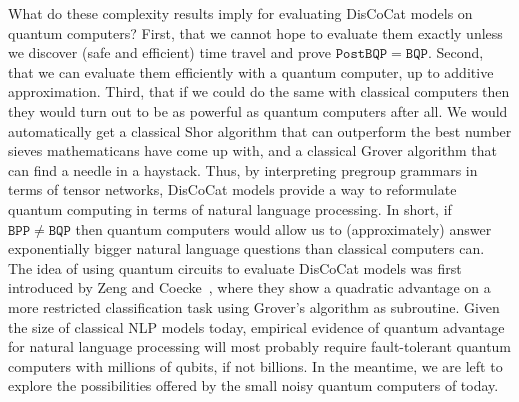 What do these complexity results imply for evaluating DisCoCat models on quantum computers?
First, that we cannot hope to evaluate them exactly unless we discover (safe and efficient) time travel and prove $\mathtt{PostBQP} = \mathtt{BQP}$.
Second, that we can evaluate them efficiently with a quantum computer, up to additive approximation.
Third, that if we could do the same with classical computers then they would turn out to be as powerful as quantum computers after all.
We would automatically get a classical Shor algorithm that can outperform the best number sieves mathematicans have come up with, and a classical Grover algorithm that can find a needle in a haystack.
Thus, by interpreting pregroup grammars in terms of tensor networks, DisCoCat models provide a way to reformulate quantum computing in terms of natural language processing.
In short, if $\mathtt{BPP} \neq \mathtt{BQP}$ then quantum computers would allow us to (approximately) answer exponentially bigger natural language questions than classical computers can.
The idea of using quantum circuits to evaluate DisCoCat models was first introduced by Zeng and Coecke~\cite{ZengCoecke16}, where they show a quadratic advantage on a more restricted classification task using Grover's algorithm as subroutine.
Given the size of classical NLP models today, empirical evidence of quantum advantage for natural language processing will most probably require fault-tolerant quantum computers with millions of qubits, if not billions.
In the meantime, we are left to explore the possibilities offered by the small noisy quantum computers of today.
